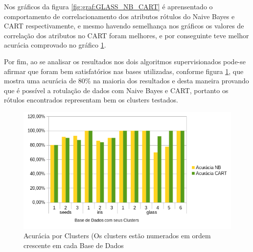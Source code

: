 Nos gráficos da figura \ref{fig:graf:GLASS_NB_CART} é aprensentado o comportamento de correlacionamento dos atributos rótulos do Naive Bayes e CART respectivamente, e mesmo havendo semelhança nos gráficos os valores de correlação dos atributos no CART foram melhores, e por conseguinte teve melhor acurácia comprovado no gráfico \ref{fig:graf:grafico_NB_CART_acuracia}.

Por fim, ao se analisar os resultados nos dois algoritmos supervisionados pode-se afirmar que  foram bem satisfatórios nas bases utilizadas, conforme figura \ref{fig:graf:grafico_NB_CART_acuracia}, que mostra uma acurácia de 80\% na maioria dos resultados e desta maneira provando que é possível a rotulação de dados com Naive Bayes e CART, portanto os rótulos encontrados representam bem os clusters testados. %

\begin{figure}[h!]
    \centering
        
  \includegraphics[scale=1]{figs/grafico_NB_CART_acuracia.png}
  \caption{Acurácia por Clusters (Os clusters estão numerados em ordem crescente em cada Base de Dados} \label{fig:graf:grafico_NB_CART_acuracia}
\end{figure}





